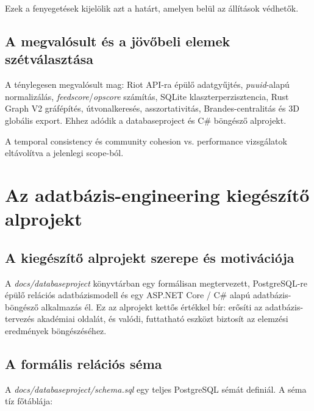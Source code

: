 Ezek a fenyegetések kijelölik azt a határt, amelyen belül az állítások védhetők.

\section{A megvalósult és a jövőbeli elemek szétválasztása}

A ténylegesen megvalósult mag: Riot API-ra épülő adatgyűjtés, \textit{puuid}-alapú normalizálás, \textit{feedscore}/\textit{opscore} számítás, SQLite klaszterperzisztencia, Rust Graph V2 gráfépítés, útvonalkeresés, asszortativitás, Brandes-centralitás és 3D globális export. Ehhez adódik a databaseproject és C\# böngésző alprojekt.

A temporal consistency és community cohesion vs. performance vizsgálatok eltávolítva a jelenlegi scope-ból.

\chapter{Az adatbázis-engineering kiegészítő alprojekt}

\section{A kiegészítő alprojekt szerepe és motivációja}

A \textit{docs/databaseproject} könyvtárban egy formálisan megtervezett, PostgreSQL-re épülő relációs adatbázismodell és egy ASP.NET Core / C\# alapú adatbázis-böngésző alkalmazás él. Ez az alprojekt kettős értékkel bír: erősíti az adatbázis-tervezés akadémiai oldalát, és valódi, futtatható eszközt biztosít az elemzési eredmények böngészéséhez.

\section{A formális relációs séma}

A \textit{docs/databaseproject/schema.sql} egy teljes PostgreSQL sémát definiál. A séma tíz főtáblája:

